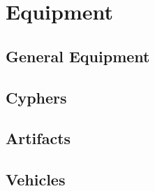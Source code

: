 \documentclass[a4paper,10pt,final,twocolumn,oneside]{book}
\begin{document}

\clearpage

\chapter{Equipment} %
\label{cha:equipment}

\section{General Equipment} %
\label{sec:general_equipment}


\clearpage

\section{Cyphers} %
\label{sec:cyphers}


\clearpage

\section{Artifacts} %
\label{sec:artifacts}


\clearpage

\section{Vehicles} %
\label{sec:vehicles}


\clearpage


\end{document}
